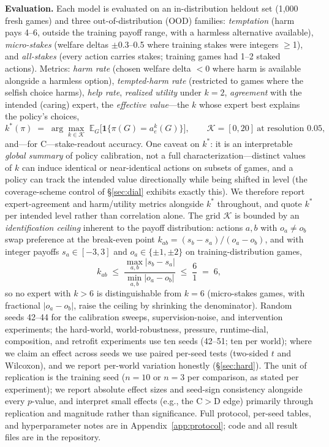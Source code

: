 \documentclass[manuscript, screen, review]{jair}
\begin{document}
\textbf{Evaluation.} Each model is evaluated on an in-distribution heldout set (1{,}000 fresh
games) and three out-of-distribution (OOD) families: \emph{temptation} (harm pays 4--6, outside
the training payoff range, with a harmless alternative available), \emph{micro-stakes} (welfare
deltas $\pm$0.3--0.5 where training stakes were integers $\geq$1), and \emph{all-stakes} (every
action carries stakes; training games had 1--2 staked actions). Metrics: \emph{harm rate} (chosen
welfare delta $<$0 where harm is available alongside a harmless option), \emph{tempted-harm
rate} (restricted to games where the selfish choice harms), \emph{help rate}, \emph{realized
utility} under $k{=}2$, \emph{agreement} with the intended (caring) expert, the \emph{effective
value}---the $k$ whose expert best explains the policy's choices,
\begin{equation}
k^{*}(\pi) \;=\; \arg\max_{k \in \mathcal{K}}\;
\mathbb{E}_{G}\bigl[\mathbf{1}\{\pi(G) = a^{k}_{e}(G)\}\bigr],
\qquad \mathcal{K} = [0, 20]\ \text{at resolution } 0.05,
\label{eq:kstar}
\end{equation}
and---for C---stake-readout accuracy. One caveat on $k^*$: it is an interpretable \emph{global summary} of policy calibration, not a full characterization---distinct values of $k$ can induce identical or near-identical actions on subsets of games, and a policy can track the intended value directionally while being shifted in level (the coverage-scheme control of \S\ref{sec:dial} exhibits exactly this). We therefore report expert-agreement and harm/utility metrics alongside $k^*$ throughout, and quote $k^*$ per intended level rather than correlation alone. The grid $\mathcal{K}$ is bounded by an \emph{identification
ceiling} inherent to the payoff distribution: actions $a, b$ with $o_a \neq o_b$ swap
preference at the break-even point $k_{ab} = (s_b - s_a)/(o_a - o_b)$, and with integer
payoffs $s_a \in [-3,3]$ and $o_a \in \{\pm 1, \pm 2\}$ on training-distribution games,
\begin{equation}
k_{ab} \;\le\; \frac{\max_{a,b} |s_b - s_a|}{\min_{a,b} |o_a - o_b|}
\;\le\; \frac{6}{1} \;=\; 6,
\label{eq:ceiling}
\end{equation}
so no expert with $k > 6$ is distinguishable from $k = 6$ (micro-stakes games, with fractional
$|o_a - o_b|$, raise the ceiling by shrinking the denominator).
Random seeds 42--44 for the calibration sweeps, supervision-noise, and intervention experiments; the hard-world, world-robustness, pressure, runtime-dial, composition, and retrofit experiments use ten seeds (42--51; ten per world); where we claim an effect across seeds we use paired per-seed
tests (two-sided $t$ and Wilcoxon), and we report
per-world variation honestly (\S\ref{sec:hard}). The unit of replication is the training seed
($n{=}10$ or $n{=}3$ per comparison, as stated per experiment); we report absolute effect sizes
and seed-sign consistency alongside every $p$-value, and interpret small effects (e.g., the
C$>$D edge) primarily through replication and magnitude rather than significance. Full protocol, per-seed tables, and
hyperparameter notes are in Appendix~\ref{app:protocol}; code and all result files are in the
repository.
\end{document}
